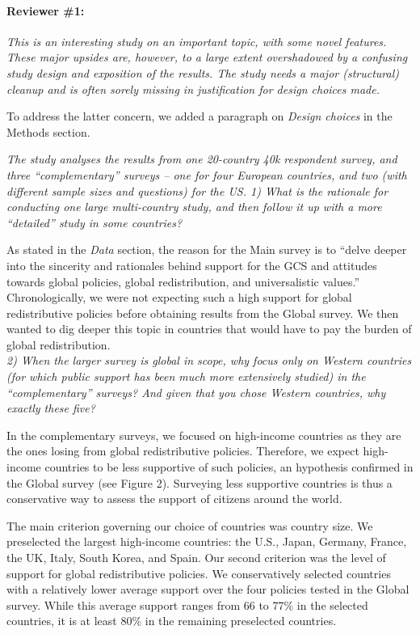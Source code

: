 \documentclass[12pt,english]{article}
\begin{document}
\paragraph*{Reviewer \#1:}
\textit{This is an interesting study on an important topic, with some novel features. These major upsides are, however, to a large extent overshadowed by a confusing study design and exposition of the results. The study needs a major (structural) cleanup and is often sorely missing in justification for design choices made.}

To address the latter concern, we added a paragraph on \textit{Design choices} in the Methods section.

\textit{The study analyses the results from one 20-country 40k respondent survey, and three “complementary” surveys – one for four European countries, and two (with different sample sizes and questions) for the US.
1) What is the rationale for conducting one large multi-country study, and then follow it up with a more “detailed” study in some countries?}

As stated in the \textit{Data} section, the reason for the Main survey is to ``delve deeper into the sincerity and rationales behind support for the GCS and attitudes towards global policies, global redistribution, and universalistic values.'' Chronologically, we were not expecting such a high support for global redistributive policies before obtaining results from the Global survey. We then wanted to dig deeper this topic in countries that would have to pay the burden of global redistribution.
~\\

\textit{2) When the larger survey is global in scope, why focus only on Western countries (for which public support has been much more extensively studied) in the “complementary” surveys? And given that you chose Western countries, why exactly these five?}

In the complementary surveys, we focused on high-income countries as they are the ones losing from global redistributive policies. Therefore, we expect high-income countries to be less supportive of such policies, an hypothesis confirmed in the Global survey (see Figure 2). Surveying less supportive countries is thus a conservative way to assess the support of citizens around the world. 

The main criterion governing our choice of countries was country size. We preselected the largest high-income countries: the U.S., Japan, Germany, France, the UK, Italy, South Korea, and Spain. Our second criterion was the level of support for global redistributive policies. We conservatively selected countries with a relatively lower average support over the four policies tested in the Global survey. While this average support ranges from 66 to 77\% in the selected countries, it is at least 80\% in the remaining preselected countries.
~\\
\end{document}
